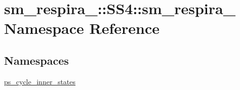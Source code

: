 \hypertarget{namespacesm__respira__1_1_1SS4_1_1sm__respira__1}{}\section{sm\+\_\+respira\+\_\+:\+:S\+S4\+:\+:sm\+\_\+respira\+\_ Namespace Reference}
\label{namespacesm__respira__1_1_1SS4_1_1sm__respira__1}
\subsection*{Namespaces}
\begin{DoxyCompactItemize}
\item 
 \hyperlink{namespacesm__respira__1_1_1SS4_1_1sm__respira__1_1_1ps__cycle__inner__states}{ps\+\_\+cycle\+\_\+inner\+\_\+states}
\end{DoxyCompactItemize}
